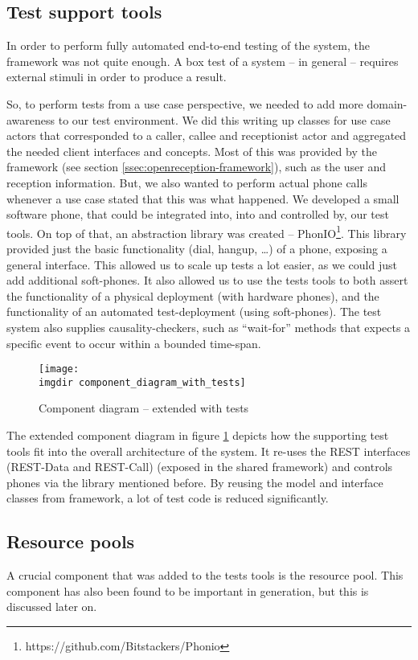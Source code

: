 \subsection{Test support tools}
\label{ssec:supporting-test-tools}
In order to perform fully automated end-to-end testing of the system, the framework was not quite enough. A box test of a system -- in general -- requires external stimuli in order to produce a result.\medskip

\noindent So, to perform tests from a use case perspective, we needed to add more domain-awareness to our test environment. We did this writing up classes for use case actors that corresponded to a caller, callee and receptionist actor and aggregated the needed client interfaces and concepts. Most of this was provided by the framework (see section \ref{ssec:openreception-framework}), such as the user and reception information. But, we also wanted to perform actual phone calls whenever a use case stated that this was what happened. We developed a small software phone, that could be integrated into, into and controlled by, our test tools. On top of that, an abstraction library was created -- PhonIO\footnote{https://github.com/Bitstackers/Phonio}. This library provided just the basic functionality (dial, hangup, \dots) of a phone, exposing a general interface. This allowed us to scale up tests a lot easier, as we could just add additional soft-phones. It also allowed us to use the tests tools to both assert the functionality of a physical deployment (with hardware phones), and the functionality of an automated test-deployment (using soft-phones). The test system also supplies causality-checkers, such as ``wait-for'' methods that expects a specific event to occur within a bounded time-span.\medskip
\begin{figure}[!htbp]
\centering
\texttt{[image: \\imgdir component\_diagram\_with\_tests]}
\caption{Component diagram -- extended with tests}
\label{fig:component_diagram_with_tests}
\end{figure}The extended component diagram in figure \ref{fig:component_diagram_with_tests} depicts how the supporting test tools fit into the overall architecture of the system. It re-uses the REST interfaces (REST-Data and REST-Call) (exposed in the shared framework) and controls phones via the library mentioned before. By reusing the model and interface classes from framework, a lot of test code is reduced significantly.
\subsection{Resource pools}
\label{ssec:resource-pools}
\noindent A crucial component that was added to the tests tools is the resource pool. This component has also been found to be important in generation, but this is discussed later on.\medskip

